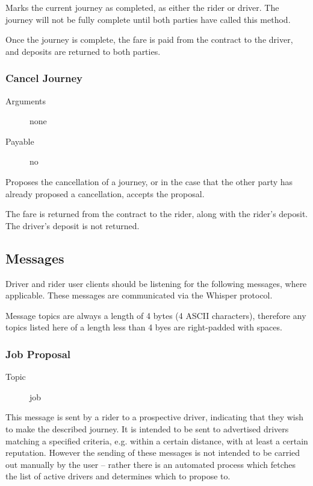 Marks the current journey as completed, as either the rider or driver. The journey will not be fully complete until both parties have called this method.

Once the journey is complete, the fare is paid from the contract to the driver, and deposits are returned to both parties.

\subsubsection{Cancel Journey}

\begin{description}
	\item [Arguments] none
	\item [Payable] no
\end{description}

Proposes the cancellation of a journey, or in the case that the other party has already proposed a cancellation, accepts the proposal.

The fare is returned from the contract to the rider, along with the rider's deposit. The driver's deposit is not returned.

\subsection{Messages}

Driver and rider user clients should be listening for the following messages, where applicable. These messages are communicated via the Whisper protocol.

Message topics are always a length of 4 bytes (4 ASCII characters), therefore any topics listed here of a length less than 4 byes are right-padded with spaces.

\subsubsection{Job Proposal}

\begin{description}
	\item [Topic] job
\end{description}

This message is sent by a rider to a prospective driver, indicating that they wish to make the described journey. It is intended to be sent to advertised drivers matching a specified criteria, e.g. within a certain distance, with at least a certain reputation. However the sending of these messages is not intended to be carried out manually by the user -- rather there is an automated process which fetches the list of active drivers and determines which to propose to.

